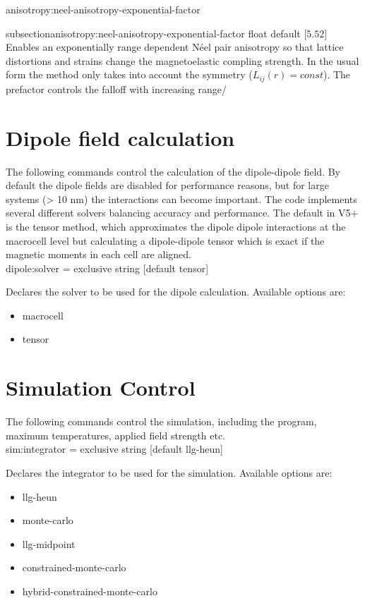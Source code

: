 {\zicf anisotropy:neel-anisotropy-exponential-factor}
{subsection}{anisotropy:neel-anisotropy-exponential-factor}
   float default [$5.52$]
   Enables an exponentially range dependent N\'eel pair anisotropy so that
   lattice distortions and strains change the magnetoelastic compling strength.
   In the usual form the method only takes into account the symmetry ($L_{ij}(r)
   = const$). The prefactor controls the falloff with increasing range/\\

\section*{Dipole field calculation}
The following commands control the calculation of the dipole-dipole field. By
default the dipole fields are disabled for performance reasons, but for large
systems (> 10 nm) the interactions can become important. The \vampire code
implements several different solvers balancing accuracy and performance. The
default in V5+ is the tensor method, which approximates the dipole dipole
interactions at the macrocell level but calculating a dipole-dipole tensor which
is exact if the magnetic moments in each cell are aligned.\\

{\zicf dipole:solver = exclusive string [default tensor]}
Declares the solver to be used for the dipole calculation. Available options are:
\begin{itemize}
  \item[] macrocell
  \item[] tensor
\end{itemize}

\section*{Simulation Control}
The following commands control the simulation, including the program, maximum temperatures, applied field strength etc.\\

{\zicf sim:integrator = exclusive string [default llg-heun]} Declares the integrator to be used for the simulation. Available options are:
\begin{itemize}
  \item[] llg-heun
  \item[] monte-carlo
  \item[] llg-midpoint
  \item[] constrained-monte-carlo
  \item[] hybrid-constrained-monte-carlo
\end{itemize}

